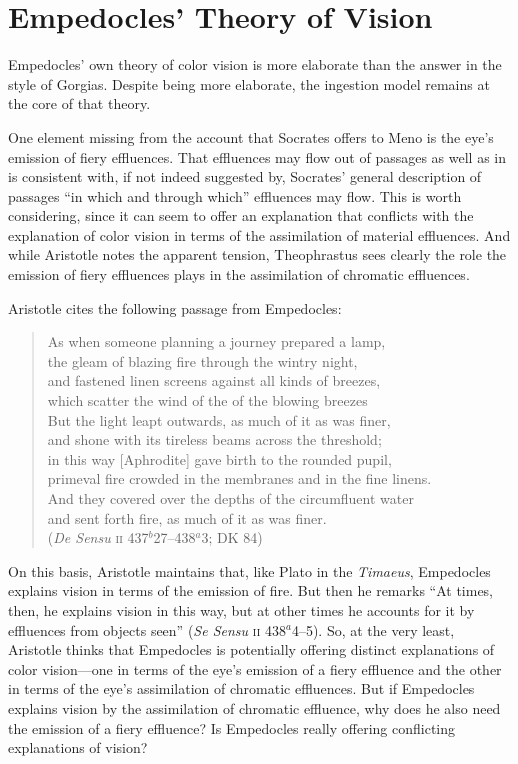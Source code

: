 
\section{Empedocles' Theory of Vision} %
\label{sec:empedocles_theory_of_vision}

Empedocles' own theory of color vision is more elaborate than the answer in the style of Gorgias. Despite being more elaborate, the ingestion model remains at the core of that theory. 

One element missing from the account that Socrates offers to Meno is the eye's emission of fiery effluences. That effluences may flow out of passages as well as in is consistent with, if not indeed suggested by, Socrates' general description of passages ``in which and through which'' effluences may flow. This is worth considering, since it can seem to offer an explanation that conflicts with the explanation of color vision in terms of the assimilation of material effluences. And while Aristotle notes the apparent tension, Theophrastus sees clearly the role the emission of fiery effluences plays in the assimilation of chromatic effluences.

Aristotle cites the following passage from Empedocles:
\begin{verse}
	As when someone planning a journey prepared a lamp,\\
	the gleam of blazing fire through the wintry night,\\
	and fastened linen screens against all kinds of breezes,\\
	which scatter the wind of the of the blowing breezes\\
	But the light leapt outwards, as much of it as was finer,\\
	and shone with its tireless beams across the threshold;\\
	in this way [Aphrodite] gave birth to the rounded pupil,\\
	primeval fire crowded in the membranes and in the fine linens.\\
	And they covered over the depths of the circumfluent water\\
	and sent forth fire, as much of it as was finer.\\
	(\emph{De Sensu} \textsc{ii} 437\( ^{b} \)27--438\( ^{a} \)3; DK 84)
\end{verse}
On this basis, Aristotle maintains that, like Plato in the \emph{Timaeus}, Empedocles explains vision in terms of the emission of fire. But then he remarks ``At times, then, he explains vision in this way, but at other times he accounts for it by effluences from objects seen'' (\emph{Se Sensu} \textsc{ii} 438\( ^{a} \)4--5). So, at the very least, Aristotle thinks that Empedocles is potentially offering distinct explanations of color vision---one in terms of the eye's emission of a fiery effluence and the other in terms of the eye's assimilation of chromatic effluences. But if Empedocles explains vision by the assimilation of chromatic effluence, why does he also need the emission of a fiery effluence? Is Empedocles really offering conflicting explanations of vision? 

